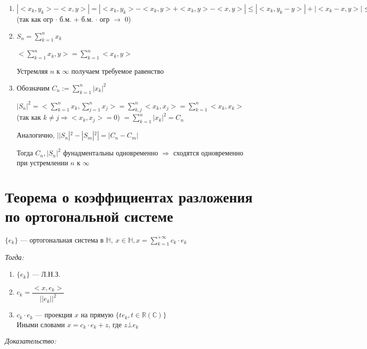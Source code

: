 \documentclass[paper=a4, fontsize=17pt]{article}
\begin{document}
\begin{enumerate}
	\item $|<x_k, y_k> - <x, y>| = |<x_k, y_k> - <x_k, y> + <x_k, y> - <x, y>| \leqslant |<x_k, y_k - y>| + |<x_k - x, y>| \leqslant |x_k| \cdot |y_k - y| + |x_k - x| \cdot |y| \rightarrow 0$ (так как огр $\cdot$ б.м. +  б.м. $\cdot$ огр $\rightarrow$ 0)

	\item $S_n = \sum\limits_{k = 1}^{n} x_k$

	$<\sum\limits_{k = 1}^n x_k, y> = \sum\limits_{k = 1}^n <x_k, y>$

	Устремляя $n$ к $\infty$ получаем требуемое равенство

	\item Обозначим $C_n := \sum\limits_{k = 1}^n |x_k|^2$

	 $|S_n|^2 = <\sum\limits_{k = 1}^n x_k, \sum\limits_{j = 1}^n x_j> = \sum\limits_{k, j}^n <x_k, x_j> = \sum\limits_{k = 1}^n <x_k, x_k>$ (так как $k \neq j \Rightarrow <x_k, x_j> = 0$) $= \sum\limits_{k = 1}^n |x_k|^2 = C_n$

	 Аналогично, $||S_n|^2 - |S_m|^2| = |C_n - C_m|$

	 Тогда $C_n, |S_n|^2$ фунадментальны одновременно $\Rightarrow$ сходятся одновременно при устремлении $n$ к $\infty$
\end{enumerate}

\section{Теорема о коэффициентах разложения по ортогональной системе}

$\{e_k\}$ {{---}} ортогональная система в $\mathds{H},\ x \in \mathds{H}, x = \sum\limits_{k=1}^{+\infty} c_k \cdot e_k$

\emph{Тогда:}
\begin{enumerate}

	\item $\{e_k\}$ {{---}} Л.Н.З.

	\item $c_k = \dfrac{<x, e_k>}{||e_k||^2}$

	\item $c_k \cdot e_k$ {{---}} проекция $x$ на прямую $\{te_k, t \in \mathbb{R}(\mathbb{C})\}$\\
	Иными словами $x = c_k \cdot e_k + z$, где $z \bot e_k$

\end{enumerate}

\emph{Доказательство:}
\end{document}
